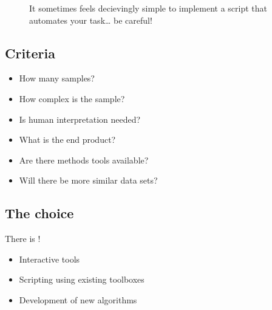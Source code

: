 \documentclass[letterpaper,10pt,english]{sphinxmanual}
\begin{document}
\begin{figure}[htbp]
\centering
\capstart

\noindent{}
\caption{It sometimes feels decievingly simple to implement a script that automates your task… be careful!}\label{\detokenize{01-Introduction:id21}}\end{figure}




\subsection{Criteria}
\label{\detokenize{01-Introduction:id5}}\begin{itemize}
\item {} 
\sphinxAtStartPar
How many samples?

\item {} 
\sphinxAtStartPar
How complex is the sample?

\item {} 
\sphinxAtStartPar
Is human interpretation needed?

\item {} 
\sphinxAtStartPar
What is the end product?

\item {} 
\sphinxAtStartPar
Are there methods tools available?

\item {} 
\sphinxAtStartPar
Will there be more similar data sets?

\end{itemize}


\subsection{The choice}
\label{\detokenize{01-Introduction:id6}}
\sphinxAtStartPar
There is !
\begin{itemize}
\item {} 
\sphinxAtStartPar
Interactive tools

\item {} 
\sphinxAtStartPar
Scripting using existing toolboxes

\item {} 
\sphinxAtStartPar
Development of new algorithms

\end{itemize}
\end{document}
